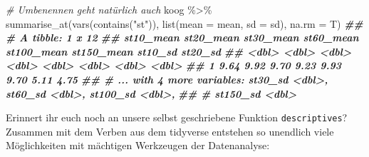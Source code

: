\documentclass[
]{article}
\newenvironment{Shaded}{\begin{snugshade}}{\end{snugshade}}
\newcommand{\AttributeTok}[1]{\textcolor[rgb]{0.77,0.63,0.00}{#1}}
\newcommand{\CommentTok}[1]{\textcolor[rgb]{0.56,0.35,0.01}{\textit{#1}}}
\newcommand{\DocumentationTok}[1]{\textcolor[rgb]{0.56,0.35,0.01}{\textbf{\textit{#1}}}}
\newcommand{\FunctionTok}[1]{\textcolor[rgb]{0.00,0.00,0.00}{#1}}
\newcommand{\NormalTok}[1]{#1}
\newcommand{\SpecialCharTok}[1]{\textcolor[rgb]{0.00,0.00,0.00}{#1}}
\newcommand{\StringTok}[1]{\textcolor[rgb]{0.31,0.60,0.02}{#1}}
\begin{document}
\begin{Shaded}
\begin{Highlighting}[]
\CommentTok{\# Umbenennen geht natürlich auch }
\NormalTok{koog }\SpecialCharTok{\%\textgreater{}\%}
  \FunctionTok{summarise\_at}\NormalTok{(}\FunctionTok{vars}\NormalTok{(}\FunctionTok{contains}\NormalTok{(}\StringTok{"st"}\NormalTok{)), }\FunctionTok{list}\NormalTok{(}\AttributeTok{mean =}\NormalTok{ mean, }\AttributeTok{sd =}\NormalTok{ sd), }\AttributeTok{na.rm =}\NormalTok{ T)}
\DocumentationTok{\#\# \# A tibble: 1 x 12}
\DocumentationTok{\#\#   st10\_mean st20\_mean st30\_mean st60\_mean st100\_mean st150\_mean st10\_sd st20\_sd}
\DocumentationTok{\#\#       \textless{}dbl\textgreater{}     \textless{}dbl\textgreater{}     \textless{}dbl\textgreater{}     \textless{}dbl\textgreater{}      \textless{}dbl\textgreater{}      \textless{}dbl\textgreater{}   \textless{}dbl\textgreater{}   \textless{}dbl\textgreater{}}
\DocumentationTok{\#\# 1      9.64      9.92      9.70      9.23       9.93       9.70    5.11    4.75}
\DocumentationTok{\#\# \# ... with 4 more variables: st30\_sd \textless{}dbl\textgreater{}, st60\_sd \textless{}dbl\textgreater{}, st100\_sd \textless{}dbl\textgreater{},}
\DocumentationTok{\#\# \#   st150\_sd \textless{}dbl\textgreater{}}
\end{Highlighting}
\end{Shaded}

Erinnert ihr euch noch an unsere selbst geschriebene Funktion \texttt{descriptives}? Zusammen mit dem Verben aus dem tidyverse entstehen so unendlich viele Möglichkeiten mit mächtigen Werkzeugen der Datenanalyse:
\end{document}
